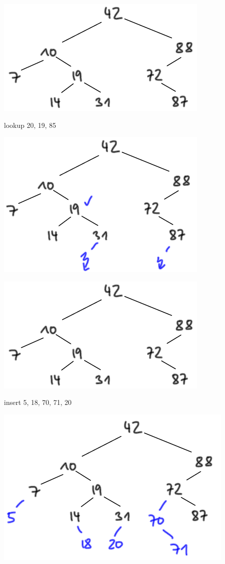 \documentclass{beamer}
\begin{document}
\begin{frame}[fragile]


\includegraphics[scale=0.6]{suchbaum2.png}    

lookup 20, 19, 85 \pause 

\includegraphics[scale=0.6]{suchbaum3.png}
\end{frame}

\begin{frame}[fragile]
\includegraphics[scale=0.6]{suchbaum2.png}   

insert 5, 18, 70, 71, 20 \pause 

\includegraphics[scale=0.6]{suchbaum4.png}  
 
\end{frame}
\end{document}
